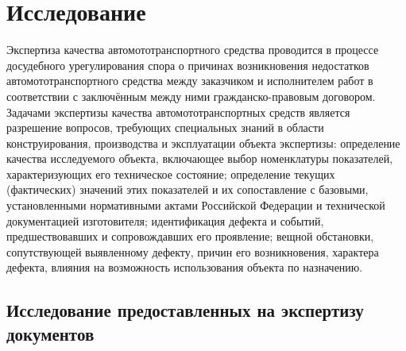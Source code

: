 %



\section{Исследование}
%
Экспертиза качества автомототранспортного средства проводится в процессе досудебного урегулирования спора о причинах возникновения недостатков автомототранспортного средства между заказчиком и  исполнителем работ в соответствии  с заключённым между ними гражданско-правовым договором.
Задачами экспертизы качества автомототранспортных средств является разрешение вопросов, требующих специальных знаний в области конструирования, производства и эксплуатации объекта экспертизы: определение качества исследуемого объекта, включающее выбор номенклатуры показателей, характеризующих его техническое состояние; определение текущих (фактических) значений этих показателей и их сопоставление с базовыми, установленными нормативными актами Российской Федерации и технической документацией изготовителя; идентификация дефекта и событий, предшествовавших и сопровождавших его проявление; вещной обстановки, сопутствующей выявленному дефекту, причин его возникновения, характера дефекта, влияния на возможность использования объекта по назначению.

\subsection{Исследование предоставленных на экспертизу документов}

